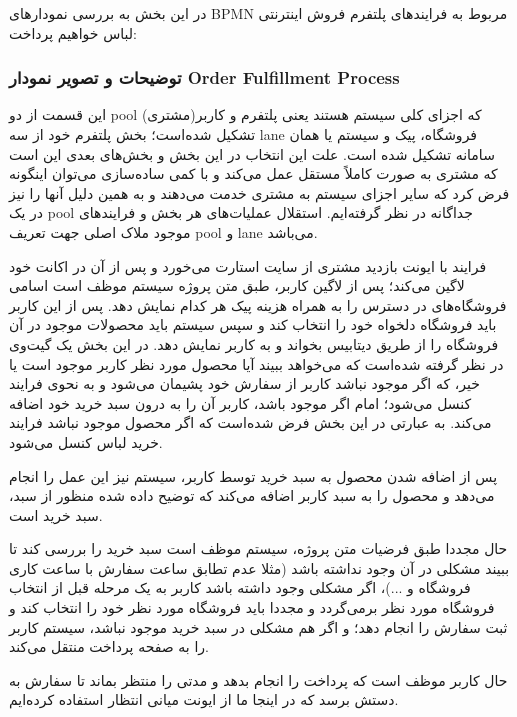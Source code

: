 \documentclass[]{article}
\begin{document}
در این بخش به بررسی نمودارهای BPMN مربوط به فرایندهای پلتفرم فروش
اینترنتی لباس خواهیم پرداخت:

\subsubsection{توضیحات و تصویر نمودار Order Fulfillment
Process}\label{ux62aux648ux636ux6ccux62dux627ux62a-ux648-ux62aux635ux648ux6ccux631-ux646ux645ux648ux62fux627ux631-order-fulfillment-process}

این قسمت از دو pool که اجزای کلی سیستم هستند یعنی پلتفرم و کاربر(مشتری)
تشکیل شده‌است؛ بخش پلتفرم خود از سه lane فروشگاه، پیک و سیستم یا همان
سامانه تشکیل شده است. علت این انتخاب در این بخش و بخش‌های بعدی این است
که مشتری به صورت کاملاً مستقل عمل می‌کند و با کمی ساده‌سازی می‌توان
اینگونه فرض کرد که سایر اجزای سیستم به مشتری خدمت می‌دهند و به همین دلیل
آنها را نیز در یک pool جداگانه در نظر گرفته‌ایم. استقلال عملیات‌های هر
بخش و فرایندهای موجود ملاک اصلی جهت تعریف pool و lane می‌باشد.

فرایند با ایونت بازدید مشتری از سایت استارت می‌خورد و پس از آن در اکانت
خود لاگین می‌کند؛ پس از لاگین کاربر، طبق متن پروژه سیستم موظف است اسامی
فروشگاه‌های در دسترس را به همراه هزینه پیک هر کدام نمایش دهد. پس از این
کاربر باید فروشگاه دلخواه خود را انتخاب کند و سپس سیستم باید محصولات
موجود در آن فروشگاه را از طریق دیتابیس بخواند و به کاربر نمایش دهد. در
این بخش یک گیت‌وی در نظر گرفته شده‌است که می‌خواهد ببیند آیا محصول مورد
نظر کاربر موجود است یا خیر، که اگر موجود نباشد کاربر از سفارش خود پشیمان
می‌شود و به نحوی فرایند کنسل می‌شود؛ امام اگر موجود باشد، کاربر آن را به
درون سبد خرید خود اضافه می‌کند. به عبارتی در این بخش فرض شده‌است که اگر
محصول موجود نباشد فرایند خرید لباس کنسل می‌شود.

پس از اضافه شدن محصول به سبد خرید توسط کاربر، سیستم نیز این عمل را انجام
می‌دهد و محصول را به سبد کاربر اضافه می‌کند که توضیح داده شده منظور از
سبد، سبد خرید است.

حال مجددا طبق فرضیات متن پروژه، سیستم موظف است سبد خرید را بررسی کند تا
ببیند مشکلی در آن وجود نداشته باشد (مثلا عدم تطابق ساعت سفارش با ساعت
کاری فروشگاه و ...)، اگر مشکلی وجود داشته باشد کاربر به یک مرحله قبل از
انتخاب فروشگاه مورد نظر برمی‌گردد و مجددا باید فروشگاه مورد نظر خود را
انتخاب کند و ثبت سفارش را انجام دهد؛ و اگر هم مشکلی در سبد خرید موجود
نباشد، سیستم کاربر را به صفحه پرداخت منتقل می‌کند.

حال کاربر موظف است که پرداخت را انجام بدهد و مدتی را منتظر بماند تا
سفارش به دستش برسد که در اینجا ما از ایونت میانی انتظار استفاده
کرده‌ایم.
\end{document}
